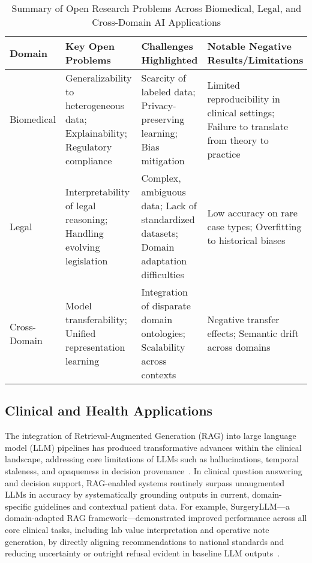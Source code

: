 \documentclass[sigconf]{acmart}
\begin{document}
\begin{table*}[htbp]
\centering
\caption{Summary of Open Research Problems Across Biomedical, Legal, and Cross-Domain AI Applications}
\label{tab:open_problems_applications}
\begin{adjustbox}{max width=\textwidth}
\begin{tabular}{@{}llll@{}}
\toprule
Domain & Key Open Problems & Challenges Highlighted & Notable Negative Results/Limitations \\
\midrule
Biomedical & Generalizability to heterogeneous data; Explainability; Regulatory compliance & Scarcity of labeled data; Privacy-preserving learning; Bias mitigation & Limited reproducibility in clinical settings; Failure to translate from theory to practice \\
Legal & Interpretability of legal reasoning; Handling evolving legislation & Complex, ambiguous data; Lack of standardized datasets; Domain adaptation difficulties & Low accuracy on rare case types; Overfitting to historical biases \\
Cross-Domain & Model transferability; Unified representation learning & Integration of disparate domain ontologies; Scalability across contexts & Negative transfer effects; Semantic drift across domains \\
\bottomrule
\end{tabular}
\end{adjustbox}
\end{table*}

\subsection{Clinical and Health Applications}

The integration of Retrieval-Augmented Generation (RAG) into large language model (LLM) pipelines has produced transformative advances within the clinical landscape, addressing core limitations of LLMs such as hallucinations, temporal staleness, and opaqueness in decision provenance~\cite{ref1, ref2, ref3, ref5, ref6, ref7, ref8, ref29, ref30, ref31, ref42, ref48, ref52, ref53, ref54, ref55}. In clinical question answering and decision support, RAG-enabled systems routinely surpass unaugmented LLMs in accuracy by systematically grounding outputs in current, domain-specific guidelines and contextual patient data. For example, SurgeryLLM—a domain-adapted RAG framework—demonstrated improved performance across all core clinical tasks, including lab value interpretation and operative note generation, by directly aligning recommendations to national standards and reducing uncertainty or outright refusal evident in baseline LLM outputs~\cite{ref1}.
\end{document}
